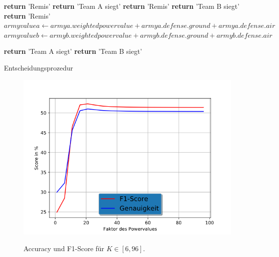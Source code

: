 \begin{algorithm}
\begin{algorithmic}[1]
	\State \textbf{return} 'Remis' 
\EndIf
{}
		\State \textbf{return} 'Team A siegt'
	\Else 
		\State \textbf{return} 'Remis'
	\EndIf
\EndIf
{}
	\State \textbf{return} 'Team B siegt'
\Else 
	\State \textbf{return} 'Remis' 
\EndIf
\EndIf
\State $armyvaluea \leftarrow armya.weightedpowervalue + armya.defense.ground + armya.defense.air$
\State $armyvalueb \leftarrow armyb.weightedpowervalue + armyb.defense.ground + armyb.defense.air$

	\State \textbf{return} 'Team A siegt'
\Else
	\State \textbf{return} 'Team B siegt'
\EndIf
\EndProcedure
\end{algorithmic}
\caption{Entscheidungsprozedur}
\label{alg:decider}
\end{algorithm}

\begin{figure}[H]
\centering
\includegraphics[scale=0.8]{pictures/konstantenVollesModell}
\label{fig:konstante_baseline}
\caption{Accuracy und F1-Score für $K \in [6, 96]$.}
\end{figure}
 
